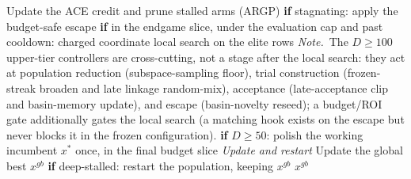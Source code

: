 \begin{algorithm}[p]
\begin{algorithmic}[1]
  \State Update the ACE credit and prune stalled arms (ARGP)
  \State \textbf{if} stagnating: apply the budget-safe escape 
  \State \textbf{if} in the endgame slice, under the evaluation cap and past cooldown: charged coordinate local search on the elite rows 
  \Statex \quad\emph{Note.}~\textnormal{The $D{\ge}100$ upper-tier controllers are cross-cutting, not a stage after the local search: they act at population reduction (subspace-sampling floor), trial construction (frozen-streak broaden and late linkage random-mix), acceptance (late-acceptance clip and basin-memory update), and escape (basin-novelty reseed); a budget/ROI gate additionally gates the local search (a matching hook exists on the escape but never blocks it in the frozen configuration).}
  \State \textbf{if} $D{\ge}50$: polish the working incumbent $x^{*}$ once, in the final budget slice 
  \Statex
  \Statex \quad\emph{Update and restart}
  \State Update the global best $x^{gb}$
  \State \textbf{if} deep-stalled: restart the population, keeping $x^{gb}$
\EndWhile
\Statex
\State \Return $x^{gb}$
\end{algorithmic}
\end{algorithm}
